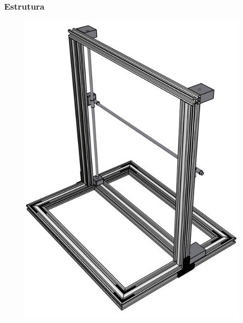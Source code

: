 \begin{frame}
\frametitle{Estrutura}

\begin{figure}
\centering
\includegraphics[scale = 0.4]{figs/estruturamesa}
\end{figure}  

\end{frame}
    
